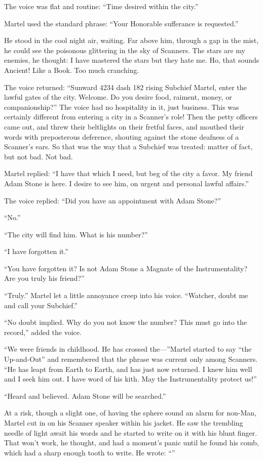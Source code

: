 The voice was flat and routine: ``Time desired within the city.''

Martel used the standard phrase: ``Your Honorable sufferance is requested.''

He stood in the cool night air, waiting. Far above him, through a gap in the mist, he could see the poisonous glittering in the sky of Scanners. The stars are my enemies, he thought: I have mastered the stars but they hate me. Ho, that sounds Ancient! Like a Book. Too much cranching.

The voice returned: ``Sunward 4234 dash 182 rising Subchief Martel, enter the lawful gates of the city. Welcome. Do you desire food, raiment, money, or companionship?'' The voice had no hospitality in it, just business. This was certainly different from entering a city in a Scanner's role! Then the petty officers came out, and threw their beltlights on their fretful faces, and mouthed their words with preposterous deference, shouting against the stone deafness of a Scanner's ears. So that was the way that a Subchief was treated: matter of fact, but not bad. Not bad.

Martel replied: ``I have that which I need, but beg of the city a favor. My friend Adam Stone is here. I desire to see him, on urgent and personal lawful affairs.''

The voice replied: ``Did you have an appointment with Adam Stone?''

``No.''

``The city will find him. What is his number?''

``I have forgotten it.''

``You have forgotten it? Is not Adam Stone a Magnate of the Instrumentality? Are you truly his friend?''

``Truly.'' Martel let a little annoyance creep into his voice. ``Watcher, doubt me and call your Subchief.''

``No doubt implied. Why do you not know the number? This must go into the record,'' added the voice.

``We were friends in childhood. He has crossed the---''Martel started to say ``the Up-and-Out'' and remembered that the phrase was current only among Scanners. ``He has leapt from Earth to Earth, and has just now returned. I knew him well and I seek him out. I have word of his kith. May the Instrumentality protect us!''

``Heard and believed. Adam Stone will be searched.''

At a risk, though a slight one, of having the sphere sound an alarm for non-Man, Martel cut in on his Scanner speaker within his jacket. He saw the trembling needle of light await his words and he started to write on it with his blunt finger. That won't work, he thought, and had a moment's panic until he found his comb, which had a sharp enough tooth to write. He wrote: ``''

